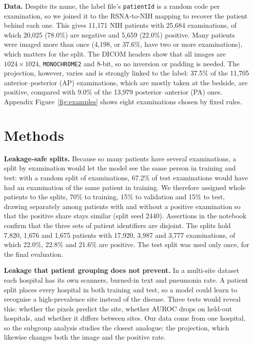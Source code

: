 \documentclass[11pt,a4paper]{article}
\begin{document}
\textbf{Data.} Despite its name, the label file's \texttt{patientId} is a random code per examination, so we joined it to the RSNA-to-NIH mapping to recover the patient behind each one. This gives 11{,}171 NIH patients with 25{,}684 examinations, of which 20{,}025 (78.0\%) are negative and 5{,}659 (22.0\%) positive. Many patients were imaged more than once (4{,}198, or 37.6\%, have two or more examinations), which matters for the split. The DICOM
headers show that all images are $1024\times1024$, \texttt{MONOCHROME2} and 8-bit, so no inversion or padding is needed.
The projection, however, varies and is strongly linked to the label: 37.5\% of the 11{,}705 anterior--posterior (AP)
examinations, which are mostly taken at the bedside, are positive, compared with 9.0\% of the 13{,}979
posterior--anterior (PA) ones. Appendix Figure~\ref{fig:examples} shows eight examinations chosen by fixed rules.

\section{Methods}
\textbf{Leakage-safe splits.} Because so many patients have several examinations, a split by examination would let the
model see the same person in training and test: with a random split of examinations, 67.2\% of test examinations would
have had an examination of the same patient in training. We therefore assigned whole patients to the splits, 70\% to
training, 15\% to validation and 15\% to test, drawing separately among patients with and without a positive examination so
that the positive share stays similar (split seed 2440). Assertions in the notebook confirm that the three sets of patient
identifiers are disjoint. The splits hold 7{,}820, 1{,}676 and 1{,}675 patients with 17{,}920, 3{,}987 and 3{,}777
examinations, of which 22.0\%, 22.8\% and 21.6\% are positive. The test split was used only once, for the final evaluation.

\textbf{Leakage that patient grouping does not prevent.} In a multi-site dataset each hospital has its own scanners,
burned-in text and pneumonia rate. A patient split places every hospital in both training and test, so a model could learn
to recognise a high-prevalence site instead of the disease. Three tests would reveal this: whether the pixels predict the site, whether AUROC drops on held-out hospitals, and whether it differs between sites. Our data come from one hospital, so the subgroup analysis studies the closest analogue: the projection, which likewise changes both the image and the positive rate.
\end{document}
